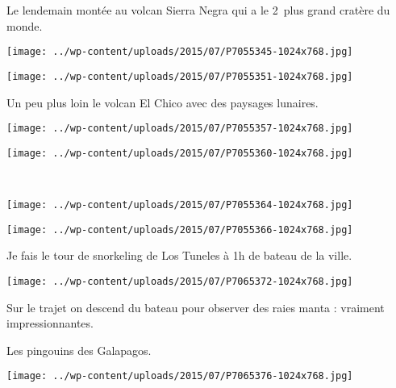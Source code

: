 Le lendemain montée au volcan Sierra Negra qui a le 2\ieme\ plus grand cratère du monde. 
\begin{center} \texttt{[image: ../wp-content/uploads/2015/07/P7055345-1024x768.jpg]} \end{center}
\begin{center} \texttt{[image: ../wp-content/uploads/2015/07/P7055351-1024x768.jpg]} \end{center}
\vspace{-\topsep}
\vspace{-2.75mm}
\pagebreak

Un peu plus loin le volcan El Chico avec des paysages lunaires. 
\begin{center} \texttt{[image: ../wp-content/uploads/2015/07/P7055357-1024x768.jpg]} \end{center}
\begin{center} \texttt{[image: ../wp-content/uploads/2015/07/P7055360-1024x768.jpg]} \end{center}
\vspace{-\topsep}
\vspace{-3.25mm}
\pagebreak
~
\begin{center} \texttt{[image: ../wp-content/uploads/2015/07/P7055364-1024x768.jpg]} \end{center}
\begin{center} \texttt{[image: ../wp-content/uploads/2015/07/P7055366-1024x768.jpg]} \end{center}
\vspace{-\topsep}
\vspace{-3.25mm}
\pagebreak

Je fais le tour de snorkeling de Los Tuneles à 1h de bateau de la ville. \\
\begin{center} \texttt{[image: ../wp-content/uploads/2015/07/P7065372-1024x768.jpg]} \end{center}

Sur le trajet on descend du bateau pour observer des raies manta : vraiment impressionnantes.
 
Les pingouins des Galapagos.
\begin{center} \texttt{[image: ../wp-content/uploads/2015/07/P7065376-1024x768.jpg]} \end{center}
\vspace{-\topsep}
\pagebreak

